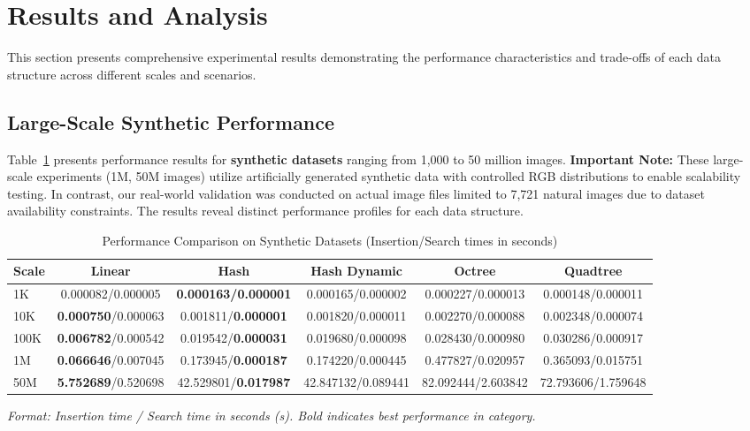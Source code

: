 \documentclass{sbc2023}
\begin{document}
\section{Results and Analysis}
\label{sec:results}

This section presents comprehensive experimental results demonstrating the performance characteristics and trade-offs of each data structure across different scales and scenarios.

\subsection{Large-Scale Synthetic Performance}

Table~\ref{tab:synthetic_performance} presents performance results for \textbf{synthetic datasets} ranging from 1,000 to 50 million images. \textbf{Important Note:} These large-scale experiments (1M, 50M images) utilize artificially generated synthetic data with controlled RGB distributions to enable scalability testing. In contrast, our real-world validation was conducted on actual image files limited to 7,721 natural images due to dataset availability constraints. The results reveal distinct performance profiles for each data structure.

\begin{table}[H]
    \footnotesize 
    \centering
    \caption{Performance Comparison on Synthetic Datasets (Insertion/Search times in seconds)}
    \label{tab:synthetic_performance}
    \setlength{\tabcolsep}{3pt}
    \begin{tabularx}{\columnwidth}{|l|c|c|c|c|c|}
        \hline
        \textbf{Scale} & \textbf{Linear} & \textbf{Hash} & \textbf{Hash Dynamic} & \textbf{Octree} & \textbf{Quadtree} \\
        \hline
        1K & 0.000082/0.000005 & \textbf{0.000163/0.000001} & 0.000165/0.000002 & 0.000227/0.000013 & 0.000148/0.000011 \\
        10K & \textbf{0.000750}/0.000063 & 0.001811/\textbf{0.000001} & 0.001820/0.000011 & 0.002270/0.000088 & 0.002348/0.000074 \\
        100K & \textbf{0.006782}/0.000542 & 0.019542/\textbf{0.000031} & 0.019680/0.000098 & 0.028430/0.000980 & 0.030286/0.000917 \\
        1M & \textbf{0.066646}/0.007045 & 0.173945/\textbf{0.000187} & 0.174220/0.000445 & 0.477827/0.020957 & 0.365093/0.015751 \\
        50M & \textbf{5.752689}/0.520698 & 42.529801/\textbf{0.017987} & 42.847132/0.089441 & 82.092444/2.603842 & 72.793606/1.759648 \\
        \hline
    \end{tabularx}
    \vspace{0.2cm}
    \begin{minipage}{\columnwidth}
    \footnotesize
    \textit{Format: Insertion time / Search time in seconds (s). Bold indicates best performance in category.}
    \end{minipage}
\end{table}
\end{document}
